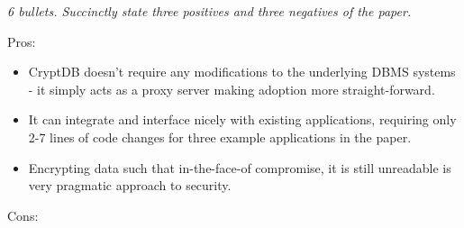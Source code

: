 \documentclass[11pt]{article}
\begin{document}
\textsl{6 bullets. Succinctly state three positives and three negatives of the
paper.}

Pros:

\begin{itemize}

    \item CryptDB doesn't require any modifications to the underlying DBMS
    systems - it simply acts as a proxy server making adoption more
    straight-forward.

    \item It can integrate and interface nicely with existing applications,
    requiring only 2-7 lines of code changes for three example applications in
    the paper.

    \item Encrypting data such that in-the-face-of compromise, it is still
    unreadable is very pragmatic approach to security.

\end{itemize}

Cons:
\end{document}
